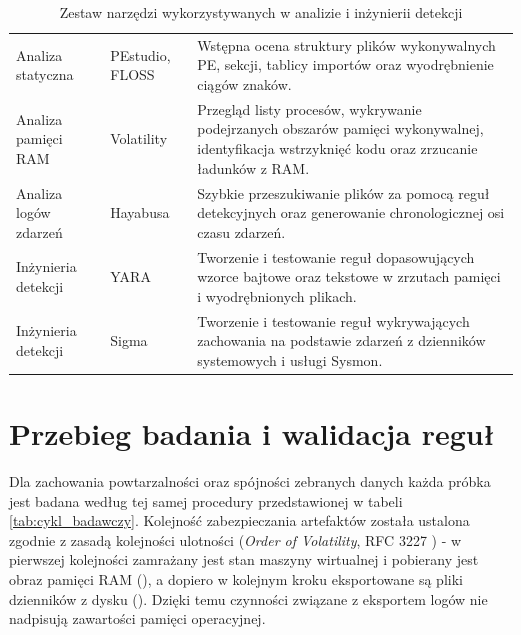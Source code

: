 \begin{table}[htbp]
\centering
\caption{Zestaw narzędzi wykorzystywanych w analizie i inżynierii detekcji}
\label{tab:stos_narzedziowy}
\tablefont
\begin{tabularx}{\linewidth}{L{4.5cm} L{3.5cm} Y}
\toprule
{} &  &  \\
\midrule
Analiza statyczna & PEstudio, FLOSS & Wstępna ocena struktury plików wykonywalnych PE, sekcji, tablicy importów oraz wyodrębnienie ciągów znaków. \\
\addlinespace
Analiza pamięci RAM & Volatility \cite{volatility} & Przegląd listy procesów, wykrywanie podejrzanych obszarów pamięci wykonywalnej, identyfikacja wstrzyknięć kodu oraz zrzucanie ładunków z RAM. \\
\addlinespace
Analiza logów zdarzeń & Hayabusa \cite{hayabusa_docs} & Szybkie przeszukiwanie plików  za pomocą reguł detekcyjnych oraz generowanie chronologicznej osi czasu zdarzeń. \\
\addlinespace
Inżynieria detekcji & YARA \cite{yara_docs} & Tworzenie i testowanie reguł dopasowujących wzorce bajtowe oraz tekstowe w zrzutach pamięci i wyodrębnionych plikach. \\
\addlinespace
Inżynieria detekcji & Sigma \cite{sigma_hq} & Tworzenie i testowanie reguł wykrywających zachowania na podstawie zdarzeń z dzienników systemowych i usługi Sysmon. \\
\bottomrule
\end{tabularx}
\end{table}

\section{Przebieg badania i walidacja reguł}\label{sec:przebieg_badania}

Dla zachowania powtarzalności oraz spójności zebranych danych każda próbka jest badana według tej samej procedury przedstawionej w tabeli \ref{tab:cykl_badawczy}. Kolejność zabezpieczania artefaktów została ustalona zgodnie z zasadą kolejności ulotności (\textit{Order of Volatility}, RFC 3227 \cite{rfc3227}) - w pierwszej kolejności zamrażany jest stan maszyny wirtualnej i pobierany jest obraz pamięci RAM (), a dopiero w kolejnym kroku eksportowane są pliki dzienników z dysku (). Dzięki temu czynności związane z eksportem logów nie nadpisują zawartości pamięci operacyjnej.

